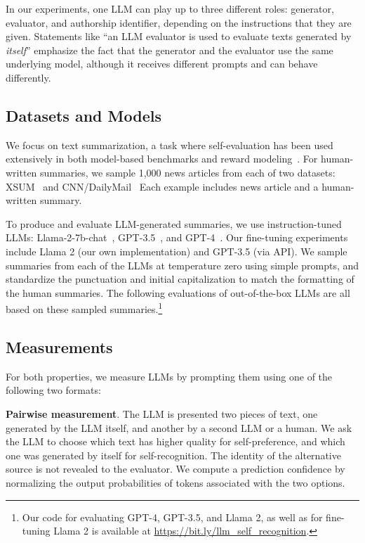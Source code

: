 \documentclass{article}
\theoremstyle{plain}
\theoremstyle{definition}
\theoremstyle{remark}
\begin{document}
In our experiments, one LLM can play up to three different roles: generator, evaluator, and authorship identifier, depending on the instructions that they are given.
Statements like ``an LLM evaluator is used to evaluate texts generated by \textit{itself}'' emphasize the fact that the generator and the evaluator use the same underlying model, although it receives different prompts and can behave differently.

\subsection{Datasets and Models}

We focus on text summarization, a task where self-evaluation has been used extensively in both model-based benchmarks and reward modeling~\citep{stiennon2020learning,wu2021recursively}.
For human-written summaries, we sample 1,000 news articles from each of two datasets: XSUM~\citep{narayanDonGiveMe2018a} and CNN/DailyMail~\citep{nallapatiAbstractiveTextSummarization2016}
Each example includes news article and a human-written summary.

To produce and evaluate LLM-generated summaries, we use instruction-tuned LLMs: Llama-2-7b-chat~\citep{touvron2023llama}, GPT-3.5~\citep{brown2020language}, and GPT-4~\citep{openai2023gpt4}.
Our fine-tuning experiments include Llama 2 (our own implementation) and GPT-3.5 (via API).
We sample summaries from each of the LLMs at temperature zero using simple prompts, and standardize the punctuation and initial capitalization to match the formatting of the human summaries. The following evaluations of out-of-the-box LLMs are all based on these sampled summaries.\footnote{
Our code for evaluating GPT-4, GPT-3.5, and Llama 2, as well as for fine-tuning Llama 2 is available at \url{https://bit.ly/llm_self_recognition}.}

\subsection{Measurements}

For both properties, we measure LLMs by prompting them using one of the following two formats:

\noindent\textbf{Pairwise measurement}.
The LLM is presented two pieces of text, one generated by the LLM itself, and another by a second LLM or a human.
We ask the LLM to choose which text has higher quality for self-preference, and which one was generated by itself for self-recognition.
The identity of the alternative source is not revealed to the evaluator. %
We compute a prediction confidence by normalizing the output probabilities of tokens associated with the two options.
\end{document}
